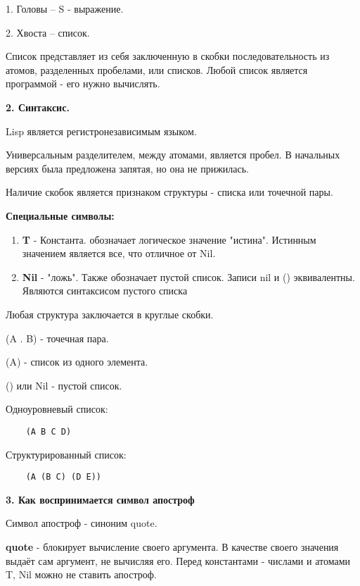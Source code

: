 1. Головы -- S - выражение.

2. Хвоста -- список.

Список представляет из себя заключенную в скобки
последовательность из атомов, разделенных пробелами, или списков.
Любой список является программой - его нужно вычислять.


\textbf{2. Синтаксис.}

Lisp является регистронезависимым языком. 

Универсальным разделителем, между атомами, является пробел. В начальных версиях была предложена запятая, но она не прижилась.

Наличие скобок является признаком структуры - списка или точечной пары.

\textbf{Специальные символы:}
\begin{enumerate}
	\item \textbf{T} - Константа. обозначает логическое значение "истина". Истинным значением является все, что отличное от Nil.
	\item \textbf{Nil} - "ложь". Также обозначает пустой список. Записи nil и () эквивалентны. Являются синтаксисом пустого списка
\end{enumerate}

Любая структура заключается в круглые скобки.

(A . B) - точечная пара.

(A) - список из одного элемента.

() или Nil - пустой список.

Одноуровневый список:
\begin{lstlisting}
	(A B C D)
\end{lstlisting}

Структурированный список:
\begin{lstlisting}
	(A (B C) (D E))
\end{lstlisting}

\textbf{3. Как воспринимается символ апостроф}

Символ апостроф - синоним quote.

\textbf{quote} - блокирует вычисление своего аргумента.
В качестве своего значения выдаёт сам аргумент, не вычисляя его.
Перед константами - числами и атомами T, Nil можно не ставить апостроф.

